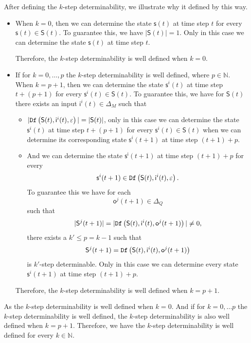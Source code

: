After defining the $k$-step determinability, we illustrate why it defined by this way.
\begin{itemize}
\item When $k=0$, then we can determine the state $\mathsf{s}(t)$ at time step $t$ for every $\mathsf{s}(t)\in \mathsf{S}(t)$. To guarantee this, we have $|\mathsf{S}(t)|=1$. Only in this case we can determine the state $\mathsf{s}(t)$ at time step $t$. 

Therefore, the $k$-step determinability is well defined when $k=0$.

\item  If for $k=0,\ldots, p$ the $k$-step determinability is well defined, where $p\in\mathbb{N}$. When $k=p+1$, then we can determine the state $\mathsf{s}^{i}(t)$ at time step $t+(p+1)$ for every $\mathsf{s}^{i}(t)\in \mathsf{S}(t)$. To guarantee this, we have for $\mathsf{S}(t)$ there exists an input $\mathsf{i}^{i}(t) \in \Delta_M$ such that
\begin{itemize}
\item $|{\tt Df}\left(\mathsf{S}(t),\mathsf{i}^{i}(t),\varepsilon\right)|=|\mathsf{S}(t)|$, only in this case we can determine the state $\mathsf{s}^{i}(t)$ at time step $t+(p+1)$ for every $\mathsf{s}^{i}(t)\in \mathsf{S}(t)$ when we can determine its corresponding state $\mathsf{s}^{i}(t+1)$ at time step $(t+1)+p$.
\item And we can determine the state $\mathsf{s^{i}}(t+1)$ at time step $(t+1)+p$ for every \[\mathsf{s}^{i}(t+1)\in {\tt Df}\left(\mathsf{S}(t),\mathsf{i}^{i}(t),\varepsilon\right).\] To guarantee this we have for each \[\mathsf{o}^{j}(t+1)\in \Delta_Q\] such that \[|\mathsf{S}^{j}(t+1)|=|{\tt Df}\left(\mathsf{S}(t),\mathsf{i}^{i}(t),\mathsf{o}^{j}(t+1)\right)|\neq 0,\] there exists a ${k'}\le p=k-1$ such that \[\mathsf{S}^{j}(t+1)={\tt Df}\left(\mathsf{S}(t),\mathsf{i}^{i}(t),\mathsf{o}^{j}(t+1)\right)\] is $k'$-step determinable. Only in this case we can determine every state $\mathsf{s}^{i}(t+1)$ at time step $(t+1)+p$.
 \end{itemize}
Therefore, the $k$-step determinability is well defined when $k=p+1$.

 \end{itemize}
 
As the $k$-step determinability is well defined when $k=0$. And if for $k=0,\ldots p$ the $k$-step determinability is well defined, the $k$-step determinability is also well defined when $k=p+1$. Therefore, we have the $k$-step determinability is well defined for every $k\in \mathbb{N}$.
 
